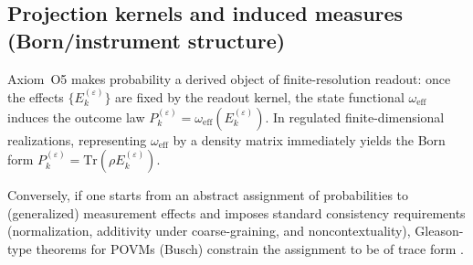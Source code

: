 \subsection{Projection kernels and induced measures (Born/instrument structure)}
Axiom~O5 makes probability a derived object of finite-resolution readout: once the effects $\{E_k^{(\varepsilon)}\}$ are fixed by the readout kernel, the state functional $\omega_{\mathrm{eff}}$ induces the outcome law $P_k^{(\varepsilon)}=\omega_{\mathrm{eff}}(E_k^{(\varepsilon)})$. In regulated finite-dimensional realizations, representing $\omega_{\mathrm{eff}}$ by a density matrix immediately yields the Born form $P_k^{(\varepsilon)}=\mathrm{Tr}(\rho E_k^{(\varepsilon)})$.
\par
Conversely, if one starts from an abstract assignment of probabilities to (generalized) measurement effects and imposes standard consistency requirements (normalization, additivity under coarse-graining, and noncontextuality), Gleason-type theorems for POVMs (Busch) constrain the assignment to be of trace form \cite{Gleason1957,Busch2003}.

